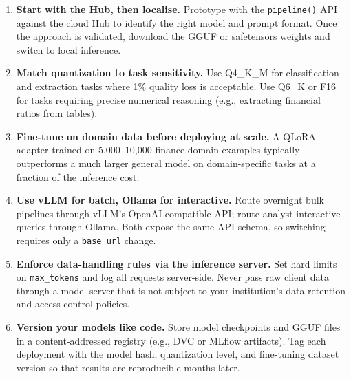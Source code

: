 \begin{enumerate}
  \item \textbf{Start with the Hub, then localise.}  Prototype with the
        \texttt{pipeline()} API against the cloud Hub to identify the right
        model and prompt format.  Once the approach is validated, download
        the GGUF or safetensors weights and switch to local inference.

  \item \textbf{Match quantization to task sensitivity.}  Use Q4\_K\_M for
        classification and extraction tasks where 1\% quality loss is
        acceptable.  Use Q6\_K or F16 for tasks requiring precise numerical
        reasoning (e.g., extracting financial ratios from tables).

  \item \textbf{Fine-tune on domain data before deploying at scale.}  A
        QLoRA adapter trained on 5{,}000--10{,}000 finance-domain examples
        typically outperforms a much larger general model on domain-specific
        tasks at a fraction of the inference cost.

  \item \textbf{Use vLLM for batch, Ollama for interactive.}  Route overnight
        bulk pipelines through vLLM's OpenAI-compatible API; route analyst
        interactive queries through Ollama.  Both expose the same API schema,
        so switching requires only a \texttt{base\_url} change.

  \item \textbf{Enforce data-handling rules via the inference server.}  Set
        hard limits on \texttt{max\_tokens} and log all requests server-side.
        Never pass raw client data through a model server that is not subject
        to your institution's data-retention and access-control policies.

  \item \textbf{Version your models like code.}  Store model checkpoints and
        GGUF files in a content-addressed registry (e.g., DVC or MLflow
        artifacts).  Tag each deployment with the model hash, quantization
        level, and fine-tuning dataset version so that results are reproducible
        months later.
\end{enumerate}
